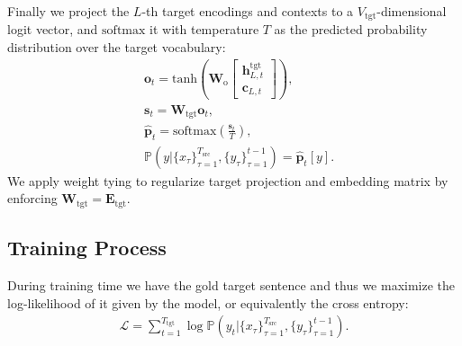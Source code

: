 \documentclass[11pt,a4paper]{article}
\begin{document}
Finally we project the $L$-th target encodings and contexts to a $V_\text{tgt}$-dimensional logit vector, and $\mathrm{softmax}$ it with temperature $T$ as the predicted probability distribution over the target vocabulary:
\begin{align}
    &\mathbf{o}_t = \mathrm{tanh}\left(\mathbf{W}_\text{o}\begin{bmatrix}
    \mathbf{h}^\text{tgt}_{L,t} \\
    \mathbf{c}_{L,t}
    \end{bmatrix}
    \right), \\
    &\mathbf{s}_t = \mathbf{W}_\mathrm{tgt}\mathbf{o}_t, \\
    &\hat{\mathbf{p}}_t = \mathrm{softmax}\left(\frac{\mathbf{s}_t}{T}\right), \\
    &\mathbb{P}(y|\{x_\tau\}_{\tau=1}^{T_\text{src}},\{y_\tau\}_{\tau=1}^{t-1}) = \hat{\mathbf{p}}_t[y].
\end{align}
We apply weight tying \cite{press2016using} to regularize target projection and embedding matrix by enforcing $\mathbf{W}_\mathrm{tgt}=\mathbf{E}_\mathrm{tgt}$.
\subsection{Training Process} \label{tp}
During training time we have the gold target sentence and thus we maximize the log-likelihood of it given by the model, or equivalently the cross entropy:
\begin{align}
    \mathcal{L} = \sum_{t=1}^{T_\text{tgt}}\log\mathbb{P}(y_t|\{x_\tau\}_{\tau=1}^{T_\text{src}},\{y_\tau\}_{\tau=1}^{t-1}).
\end{align}
\end{document}
